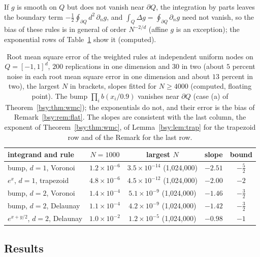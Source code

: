 \begin{remark}\label{bsy:rem:flat}
If $g$ is smooth on $Q$ but does not vanish near $\partial Q$, the integration by parts leaves the boundary term $-\frac12\oint_{\partial Q}d^2\,\partial_ng$, and $\int_Q\Delta g=\oint_{\partial Q}\partial_ng$ need not vanish, so the bias of these rules is in general of order $N^{-2/d}$ (affine $g$ is an exception); the exponential rows of Table~\ref{bsy:tab:wmc} show it (computed).
\end{remark}

\begin{table}[h]
\centering\footnotesize\setlength{\tabcolsep}{3pt}
\begin{tabular}{lcccc}
\toprule
integrand and rule & $N=1000$ & largest $N$ & slope & bound\\
\midrule
bump, $d=1$, Voronoi & $1.2\times10^{-6}$ & $3.5\times10^{-14}$ (1{,}024{,}000) & $-2.51$ & $-\frac52$\\
$e^x$, $d=1$, trapezoid & $4.8\times10^{-6}$ & $4.5\times10^{-12}$ (1{,}024{,}000) & $-2.00$ & $-2$\\
bump, $d=2$, Voronoi & $1.4\times10^{-4}$ & $5.1\times10^{-9}$ (1{,}024{,}000) & $-1.46$ & $-\frac32$\\
bump, $d=2$, Delaunay & $1.1\times10^{-4}$ & $4.2\times10^{-9}$ (1{,}024{,}000) & $-1.42$ & $-\frac32$\\
$e^{x+y/2}$, $d=2$, Delaunay & $1.0\times10^{-2}$ & $1.2\times10^{-5}$ (1{,}024{,}000) & $-0.98$ & $-1$\\
\bottomrule
\end{tabular}
\caption{Root mean square error of the weighted rules at independent uniform nodes on $Q=[-1,1]^d$, $200$ replications in one dimension and $30$ in two (about $5$ percent noise in each root mean square error in one dimension and about $13$ percent in two), the largest $N$ in brackets, slopes fitted for $N\ge4000$ (computed, floating point). The bump $\prod_ib(x_i/0.9)$ vanishes near $\partial Q$ (case (a) of Theorem~\ref{bsy:thm:wmc}); the exponentials do not, and their error is the bias of Remark~\ref{bsy:rem:flat}. The slopes are consistent with the last column, the exponent of Theorem~\ref{bsy:thm:wmc}, of Lemma~\ref{bsy:lem:trap} for the trapezoid row and of the Remark for the last row.}\label{bsy:tab:wmc}
\end{table}

\subsection{Results}

